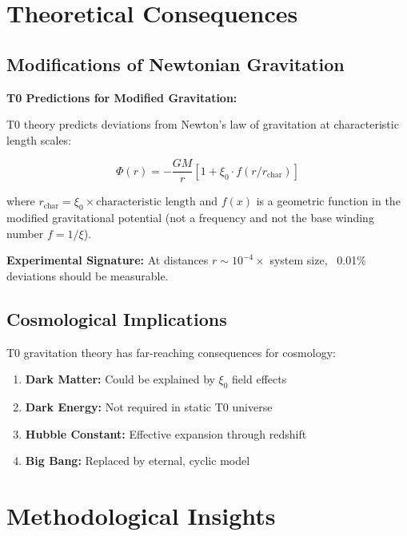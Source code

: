 	\section{Theoretical Consequences}
	
	\subsection{Modifications of Newtonian Gravitation}
	
	\begin{warning}
		\textbf{T0 Predictions for Modified Gravitation:}
		
		T0 theory predicts deviations from Newton's law of gravitation at characteristic length scales:
		
		\begin{equation}
			\Phi(r) = -\frac{GM}{r} \left[1 + \xi_0 \cdot f(r/r_{\text{char}})\right]
		\end{equation}
		
		where $r_{\text{char}} = \xi_0 \times \text{characteristic length}$ and $f(x)$ is a geometric function in the modified gravitational potential (not a frequency and not the base winding number $f = 1/\xi$).
		
		\textbf{Experimental Signature:} At distances $r \sim 10^{-4} \times$ system size, ~0.01\% deviations should be measurable.
	\end{warning}


	\subsection{Cosmological Implications}
	
	T0 gravitation theory has far-reaching consequences for cosmology:
	
	\begin{enumerate}
		\item \textbf{Dark Matter:} Could be explained by $\xi_0$ field effects
		\item \textbf{Dark Energy:} Not required in static T0 universe
		\item \textbf{Hubble Constant:} Effective expansion through redshift
		\item \textbf{Big Bang:} Replaced by eternal, cyclic model
	\end{enumerate}
	
	\section{Methodological Insights}
	
